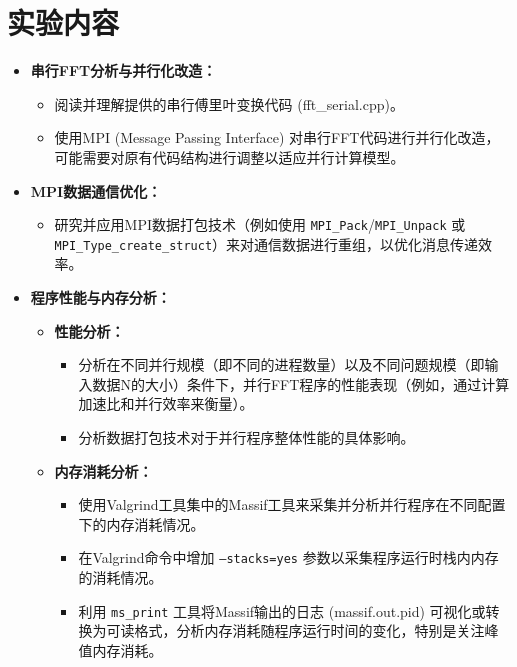 \documentclass{SYSUReport}
\begin{document}
\section{实验内容}
\begin{itemize}
    \item \textbf{串行FFT分析与并行化改造：}
    \begin{itemize}
        \item 阅读并理解提供的串行傅里叶变换代码 (fft\_serial.cpp)。
        \item 使用MPI (Message Passing Interface) 对串行FFT代码进行并行化改造，可能需要对原有代码结构进行调整以适应并行计算模型。
    \end{itemize}
    \item \textbf{MPI数据通信优化：}
    \begin{itemize}
        \item 研究并应用MPI数据打包技术（例如使用 \texttt{MPI\_Pack}/\texttt{MPI\_Unpack} 或 \texttt{MPI\_Type\_create\_struct}）来对通信数据进行重组，以优化消息传递效率。
    \end{itemize}
    \item \textbf{程序性能与内存分析：}
    \begin{itemize}
        \item \textbf{性能分析：}
        \begin{itemize}
            \item 分析在不同并行规模（即不同的进程数量）以及不同问题规模（即输入数据N的大小）条件下，并行FFT程序的性能表现（例如，通过计算加速比和并行效率来衡量）。
            \item 分析数据打包技术对于并行程序整体性能的具体影响。
        \end{itemize}
        \item \textbf{内存消耗分析：}
        \begin{itemize}
            \item 使用Valgrind工具集中的Massif工具来采集并分析并行程序在不同配置下的内存消耗情况。
            \item 在Valgrind命令中增加 \texttt{--stacks=yes} 参数以采集程序运行时栈内内存的消耗情况。
            \item 利用 \texttt{ms\_print} 工具将Massif输出的日志 (massif.out.pid) 可视化或转换为可读格式，分析内存消耗随程序运行时间的变化，特别是关注峰值内存消耗。
        \end{itemize}
    \end{itemize}
\end{itemize}
\end{document}
